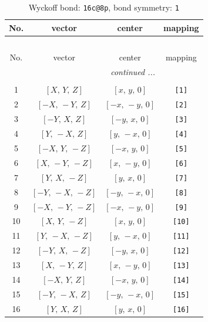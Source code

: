 \documentclass[fleqn,8pt]{jsarticle}
\begin{document}
\begin{longtable}{cccc}
\caption{Wyckoff bond: {\tt 16c@8p}, bond symmetry: {\tt 1}}
 \\
 \hline \hline
No. & vector & center & mapping \\ \hline \endfirsthead

\multicolumn{3}{l}{\tablename\ \thetable{}} \\
 \hline \hline
No. & vector & center & mapping \\ \hline \endhead

 \hline \hline
\multicolumn{3}{r}{\footnotesize\it continued ...} \\ \endfoot

 \hline \hline
\multicolumn{3}{r}{} \\ \endlastfoot

1 & $\left[ X,\, Y,\, Z \right]$ & $\left[ x,\, y,\, 0 \right]$ & {\tt [1]} \\ \hline
2 & $\left[ - X,\, - Y,\, Z \right]$ & $\left[ - x,\, - y,\, 0 \right]$ & {\tt [2]} \\ \hline
3 & $\left[ - Y,\, X,\, Z \right]$ & $\left[ - y,\, x,\, 0 \right]$ & {\tt [3]} \\ \hline
4 & $\left[ Y,\, - X,\, Z \right]$ & $\left[ y,\, - x,\, 0 \right]$ & {\tt [4]} \\ \hline
5 & $\left[ - X,\, Y,\, - Z \right]$ & $\left[ - x,\, y,\, 0 \right]$ & {\tt [5]} \\ \hline
6 & $\left[ X,\, - Y,\, - Z \right]$ & $\left[ x,\, - y,\, 0 \right]$ & {\tt [6]} \\ \hline
7 & $\left[ Y,\, X,\, - Z \right]$ & $\left[ y,\, x,\, 0 \right]$ & {\tt [7]} \\ \hline
8 & $\left[ - Y,\, - X,\, - Z \right]$ & $\left[ - y,\, - x,\, 0 \right]$ & {\tt [8]} \\ \hline
9 & $\left[ - X,\, - Y,\, - Z \right]$ & $\left[ - x,\, - y,\, 0 \right]$ & {\tt [9]} \\ \hline
10 & $\left[ X,\, Y,\, - Z \right]$ & $\left[ x,\, y,\, 0 \right]$ & {\tt [10]} \\ \hline
11 & $\left[ Y,\, - X,\, - Z \right]$ & $\left[ y,\, - x,\, 0 \right]$ & {\tt [11]} \\ \hline
12 & $\left[ - Y,\, X,\, - Z \right]$ & $\left[ - y,\, x,\, 0 \right]$ & {\tt [12]} \\ \hline
13 & $\left[ X,\, - Y,\, Z \right]$ & $\left[ x,\, - y,\, 0 \right]$ & {\tt [13]} \\ \hline
14 & $\left[ - X,\, Y,\, Z \right]$ & $\left[ - x,\, y,\, 0 \right]$ & {\tt [14]} \\ \hline
15 & $\left[ - Y,\, - X,\, Z \right]$ & $\left[ - y,\, - x,\, 0 \right]$ & {\tt [15]} \\ \hline
16 & $\left[ Y,\, X,\, Z \right]$ & $\left[ y,\, x,\, 0 \right]$ & {\tt [16]} \\
\end{longtable}
\end{document}
